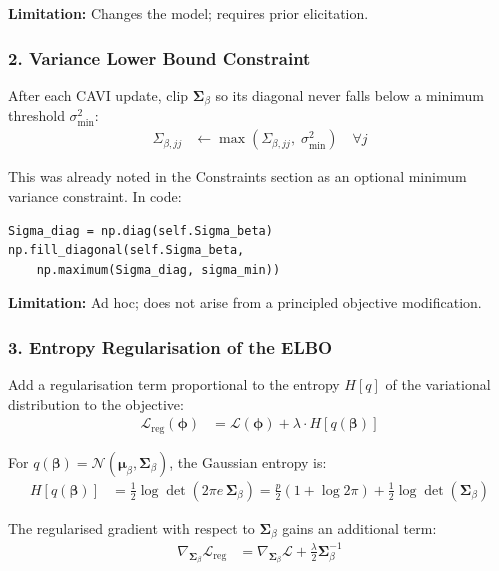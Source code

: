 \documentclass[11pt,a4paper]{article}
\begin{document}
\textbf{Limitation:} Changes the model; requires prior elicitation.

\subsubsection*{2. Variance Lower Bound Constraint}

After each CAVI update, clip $\bm{\Sigma}_\beta$ so its diagonal never falls below a minimum threshold $\sigma^2_{\min}$:
\begin{align}
  \Sigma_{\beta,jj} &\leftarrow \max\!\left(\Sigma_{\beta,jj},\; \sigma^2_{\min}\right) \quad \forall j
\end{align}

This was already noted in the Constraints section as an optional minimum variance constraint. In code:
\begin{verbatim}
Sigma_diag = np.diag(self.Sigma_beta)
np.fill_diagonal(self.Sigma_beta,
    np.maximum(Sigma_diag, sigma_min))
\end{verbatim}

\textbf{Limitation:} Ad hoc; does not arise from a principled objective modification.

\subsubsection*{3. Entropy Regularisation of the ELBO}

Add a regularisation term proportional to the entropy $H[q]$ of the variational distribution to the objective:
\begin{align}
  \mathcal{L}_{\text{reg}}(\bm{\phi}) &= \mathcal{L}(\bm{\phi}) + \lambda \cdot H[q(\bm{\beta})]
\end{align}

For $q(\bm{\beta}) = \mathcal{N}(\bm{\mu}_\beta, \bm{\Sigma}_\beta)$, the Gaussian entropy is:
\begin{align}
  H[q(\bm{\beta})] &= \frac{1}{2} \log \det(2\pi e\, \bm{\Sigma}_\beta)
               = \frac{p}{2}(1 + \log 2\pi) + \frac{1}{2}\log\det(\bm{\Sigma}_\beta)
\end{align}

The regularised gradient with respect to $\bm{\Sigma}_\beta$ gains an additional term:
\begin{align}
  \nabla_{\bm{\Sigma}_\beta} \mathcal{L}_{\text{reg}} &= \nabla_{\bm{\Sigma}_\beta} \mathcal{L} + \frac{\lambda}{2} \bm{\Sigma}_\beta^{-1}
\end{align}
\end{document}
